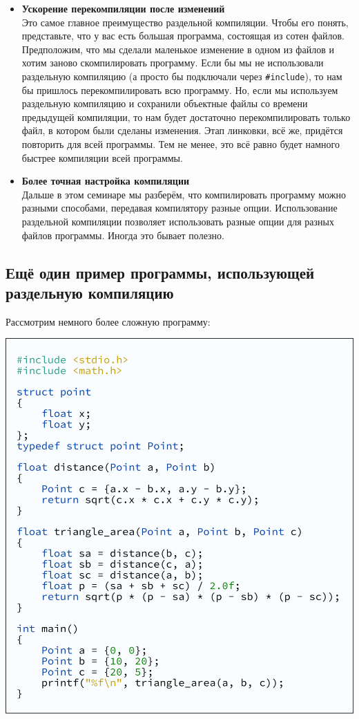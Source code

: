 \documentclass{article}
\begin{document}
\begin{itemize}
\item \textbf{Ускорение перекомпиляции после изменений}\\
Это самое главное преимущество раздельной компиляции. Чтобы его понять, представьте, что у вас есть большая программа, состоящая из сотен файлов. Предположим, что
мы сделали маленькое изменение в одном из файлов и хотим заново скомпилировать программу. Если бы мы не использовали раздельную компиляцию (а просто бы подключали через \texttt{\#include}), то нам бы пришлось перекомпилировать всю программу. Но, если мы используем раздельную компиляцию и сохранили объектные файлы со времени предыдущей компиляции, то нам будет достаточно перекомпилировать только файл, в котором были сделаны изменения. Этап линковки, всё же, придётся повторить для всей программы. Тем не менее, это всё равно будет намного быстрее компиляции всей программы.

\item \textbf{Более точная настройка компиляции}\\
Дальше в этом семинаре мы разберём, что компилировать программу можно разными способами, передавая компилятору разные опции. Использование раздельной компиляции позволяет использовать разные опции для разных файлов программы. Иногда это бывает полезно.
\end{itemize}


\subsection*{Ещё один пример программы, использующей раздельную компиляцию}
Рассмотрим немного более сложную программу:

\begin{center}
\includegraphics[scale=0.8]{../images/08another_separate.png}
\end{center}
\end{document}
